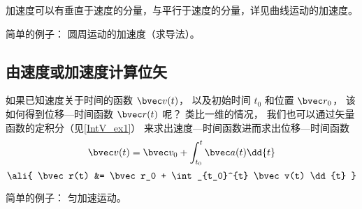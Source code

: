加速度可以有垂直于速度的分量，与平行于速度的分量，详见曲线运动的加速度。

简单的例子： 圆周运动的加速度（求导法）。

\subsection{由速度或加速度计算位矢}

如果已知速度关于时间的函数 $\bvec v(t)$， 以及初始时间 $t_0$ 和位置 $\bvec r_0$， 该如何得到位移—时间函数 $\bvec r(t)$ 呢？ 类比一维的情况， 我们也可以通过矢量函数的定积分（见\autoref{IntV_ex1}） 来求出速度—时间函数进而求出位移—时间函数
\begin{equation}\label{VnA_eq7}
\bvec v(t) = \bvec v_0 + \int_{t_0}^{t} \bvec a(t) \dd{t}
\end{equation}
\begin{equation}\label{VnA_eq8}\ali{
\bvec r(t) &= \bvec r_0 + \int_{t_0}^{t} \bvec v(t) \dd{t}
}\end{equation}

简单的例子： 匀加速运动。

